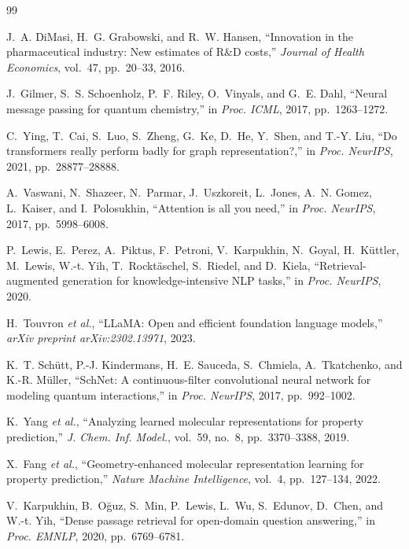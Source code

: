\documentclass[conference]{IEEEtran}
\begin{document}
\begin{thebibliography}{99}

J.~A. DiMasi, H.~G. Grabowski, and R.~W. Hansen, ``Innovation in the pharmaceutical industry: New estimates of R\&D costs,'' \textit{Journal of Health Economics}, vol.~47, pp.~20--33, 2016.

J.~Gilmer, S.~S. Schoenholz, P.~F. Riley, O.~Vinyals, and G.~E. Dahl, ``Neural message passing for quantum chemistry,'' in \textit{Proc. ICML}, 2017, pp.~1263--1272.

C.~Ying, T.~Cai, S.~Luo, S.~Zheng, G.~Ke, D.~He, Y.~Shen, and T.-Y. Liu, ``Do transformers really perform badly for graph representation?,'' in \textit{Proc. NeurIPS}, 2021, pp.~28877--28888.

A.~Vaswani, N.~Shazeer, N.~Parmar, J.~Uszkoreit, L.~Jones, A.~N. Gomez, L.~Kaiser, and I.~Polosukhin, ``Attention is all you need,'' in \textit{Proc. NeurIPS}, 2017, pp.~5998--6008.

P.~Lewis, E.~Perez, A.~Piktus, F.~Petroni, V.~Karpukhin, N.~Goyal, H.~K{\"u}ttler, M.~Lewis, W.-t. Yih, T.~Rockt{\"a}schel, S.~Riedel, and D.~Kiela, ``Retrieval-augmented generation for knowledge-intensive NLP tasks,'' in \textit{Proc. NeurIPS}, 2020.

H.~Touvron \textit{et al.}, ``LLaMA: Open and efficient foundation language models,'' \textit{arXiv preprint arXiv:2302.13971}, 2023.

K.~T. Sch{\"u}tt, P.-J. Kindermans, H.~E. Sauceda, S.~Chmiela, A.~Tkatchenko, and K.-R. M{\"u}ller, ``SchNet: A continuous-filter convolutional neural network for modeling quantum interactions,'' in \textit{Proc. NeurIPS}, 2017, pp.~992--1002.

K.~Yang \textit{et al.}, ``Analyzing learned molecular representations for property prediction,'' \textit{J. Chem. Inf. Model.}, vol.~59, no.~8, pp.~3370--3388, 2019.

X.~Fang \textit{et al.}, ``Geometry-enhanced molecular representation learning for property prediction,'' \textit{Nature Machine Intelligence}, vol.~4, pp.~127--134, 2022.

V.~Karpukhin, B.~O\u{g}uz, S.~Min, P.~Lewis, L.~Wu, S.~Edunov, D.~Chen, and W.-t. Yih, ``Dense passage retrieval for open-domain question answering,'' in \textit{Proc. EMNLP}, 2020, pp.~6769--6781.


\end{thebibliography}
\end{document}
